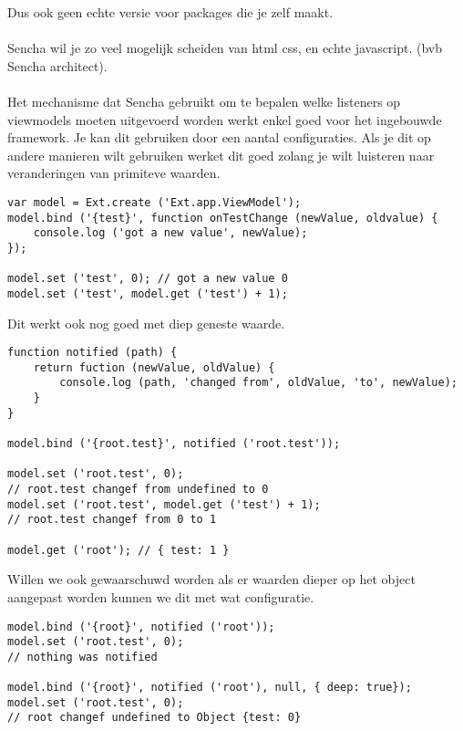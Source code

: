 Dus ook geen echte versie voor packages die je zelf maakt.


\paragraph {} Sencha wil je zo veel mogelijk scheiden van html css, en echte javascript.
(bvb Sencha architect).

\paragraph {} Het mechanisme dat Sencha gebruikt om te bepalen welke listeners op
viewmodels moeten uitgevoerd worden werkt enkel goed voor het ingebouwde framework. Je kan
dit gebruiken door een aantal configuraties. Als je dit op andere manieren wilt gebruiken
werket dit goed zolang je wilt luisteren naar veranderingen van primiteve waarden.

\begin{lstlisting}[language=ownjavascript]
var model = Ext.create ('Ext.app.ViewModel');
model.bind ('{test}', function onTestChange (newValue, oldvalue) {
	console.log ('got a new value', newValue);
});

model.set ('test', 0); // got a new value 0
model.set ('test', model.get ('test') + 1);
\end{lstlisting}

Dit werkt ook nog goed met diep geneste waarde.

\begin{lstlisting}[language=ownjavascript]
function notified (path) {
	return fuction (newValue, oldValue) {
		console.log (path, 'changed from', oldValue, 'to', newValue);
	}
}

model.bind ('{root.test}', notified ('root.test'));

model.set ('root.test', 0);
// root.test changef from undefined to 0
model.set ('root.test', model.get ('test') + 1);
// root.test changef from 0 to 1

model.get ('root'); // { test: 1 }
\end{lstlisting}

Willen we ook gewaarschuwd worden als er waarden dieper op het object aangepast worden
kunnen we dit met wat configuratie.

\begin{lstlisting}[language=ownjavascript]
model.bind ('{root}', notified ('root'));
model.set ('root.test', 0);
// nothing was notified

model.bind ('{root}', notified ('root'), null, { deep: true});
model.set ('root.test', 0);
// root changef undefined to Object {test: 0}
\end{lstlisting}

